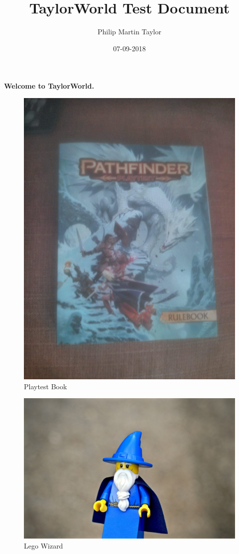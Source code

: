 \documentclass[12pt,a4paper]{book}
\date{07-09-2018}
\author{Philip Martin Taylor}
\title{TaylorWorld Test Document}
\begin{document}
\begin{center}
\textbf{Welcome to TaylorWorld.}
\end{center}
\begin{figure}[h]
  \centering
  \includegraphics[scale=0.03]{img.jpg}
  \caption{Playtest Book}
\end{figure}
\begin{figure}
  \centering
  \includegraphics[scale=0.1]{wizard.jpg}
  \caption{Lego Wizard}
\end{figure}
\end{document}
